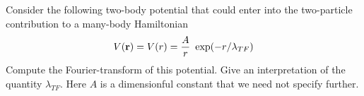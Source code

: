 \begin{problem}

	Consider the following two-body potential that could enter into the two-particle contribution to a many-body Hamiltonian
	\begin{eqnarray}
		V({\bf r}) = V(r) = \frac{A}{r} ~ \exp(-r/\lambda_{TF}) \nonumber 
	\end{eqnarray} 
	Compute the Fourier-transform of this potential. Give an interpretation of the quantity $\lambda_{TF}$. Here $A$ is a dimensionful constant that we need not specify further. 
\end{problem}

